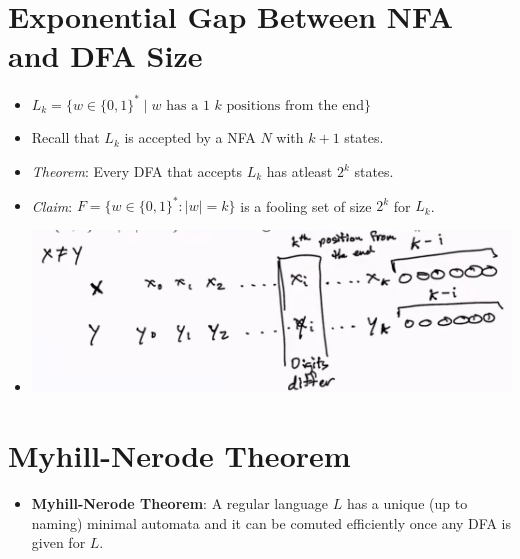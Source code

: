 \documentclass[12pt]{article}
\begin{document}
\section{Exponential Gap Between NFA and DFA Size}
\begin{itemize}
    \item $L_k = \{ w \in \{ 0, 1 \}^{\ast} \mid \text{$w$ has a 1 $k$ positions from the end} \}$
    \item Recall that $L_k$ is accepted by a NFA $N$ with $k+1$ states.
    \item \textit{Theorem}: Every DFA that accepts $L_k$ has atleast $2^k$ states.
    \item \textit{Claim}: $F = \{ w \in \{ 0, 1 \}^{\ast}: \left|w\right| = k \}$ is a fooling set of size $2^k$ for $L_k$.
    \item[] \includegraphics[width=\textwidth]{images/fooling-set-2^k.png}
\end{itemize}

\section{Myhill-Nerode Theorem}
\begin{itemize}
    \item \textbf{Myhill-Nerode Theorem}: A regular language $L$ has a unique (up to naming) minimal automata and it can be comuted efficiently once any DFA is given for $L$.
\end{itemize}
\end{document}
